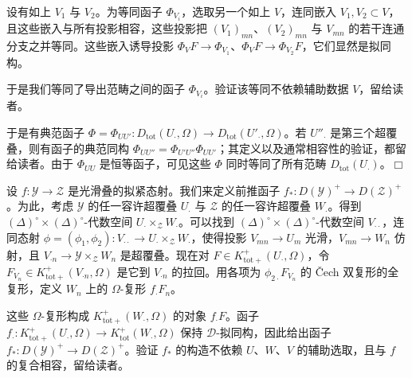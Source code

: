 设有如上 $V_{1}$ 与 $V_{2}$。为等同函子 $\Phi_{V_{i}}$，选取另一个如上 $V$，连同嵌入 $V_{1},V_{2}\subset V$，且这些嵌入与所有投影相容，这些投影把 $(V_{1})_{mn}$、$(V_{2})_{mn}$ 与 $V_{mn}$ 的若干连通分支之并等同。这些嵌入诱导投影 $\Phi_{V}F\to\Phi_{V_{1}}$、$\Phi_{V}F\to\Phi_{V_{2}}F$，它们显然是拟同构。


于是我们等同了导出范畴之间的函子 $\Phi_{V_{i}}$。验证该等同不依赖辅助数据 $V$，留给读者。

于是有典范函子 $\Phi=\Phi_{UU'}:D_{\mathrm{tot}}(U_{\cdot},\Omega)\to D_{\mathrm{tot}}(U'_{\cdot},\Omega)$。若 $U''_{\cdot}$ 是第三个超覆叠，则有函子的典范同构 $\Phi_{UU''}=\Phi_{U'U''}\Phi_{UU'}$；其定义以及通常相容性的验证，都留给读者。由于 $\Phi_{UU}$ 是恒等函子，可见这些 $\Phi$ 同时等同了所有范畴 $D_{\mathrm{tot}}(U_{\cdot})$。\hfill$\Box$

 设 $f:\mathcal{Y}\to\mathcal{Z}$ 是光滑叠的拟紧态射。我们来定义前推函子 $f_{*}:D(\mathcal{Y})^{+}\to D(\mathcal{Z})^{+}$。为此，考虑 $\mathcal{Y}$ 的任一容许超覆叠 $U_{\cdot}$ 与 $\mathcal{Z}$ 的任一容许超覆叠 $W_{\cdot}$。得到 $(\Delta)^{\circ}\times(\Delta)^{\circ}$-代数空间 $U_{\cdot}\times_{\mathcal{Z}}W_{\cdot}$。可以找到 $(\Delta)^{\circ}\times(\Delta)^{\circ}$-代数空间 $V_{\cdot\cdot}$，连同态射 $\phi=(\phi_{1},\phi_{2}):V_{\cdot\cdot}\to U_{\cdot}\times_{\mathcal{Z}}W_{\cdot}$，使得投影 $V_{mn}\to U_{m}$ 光滑，$V_{mn}\to W_{n}$ 仿射，且 $V_{\cdot n}\to\mathcal{Y}\times_{\mathcal{Z}}W_{n}$ 是超覆叠。现在对 $F\in K^{+}_{\mathrm{tot}+}(U_{\cdot},\Omega)$，令 $F_{V_{n}}\in K^{+}_{\mathrm{tot}+}(V_{\cdot n},\Omega)$ 是它到 $V_{\cdot n}$ 的拉回。用各项为 $\phi_{2\cdot}F_{V_{n}}$ 的 Čech 双复形的全复形，定义 $W_{n}$ 上的 $\Omega$-复形 $f_{\cdot}F_{n}$。


这些 $\Omega$-复形构成 $K^{+}_{\mathrm{tot}+}(W_{\cdot},\Omega)$ 的对象 $f_{\cdot}F$。函子 $f_{\cdot}:K^{+}_{\mathrm{tot}+}(U_{\cdot},\Omega)\to K^{+}_{\mathrm{tot}}(W_{\cdot},\Omega)$ 保持 $\mathcal{D}$-拟同构，因此给出函子 $f_{*}:D(\mathcal{Y})^{+}\to D(\mathcal{Z})^{+}$。验证 $f_{*}$ 的构造不依赖 $U$、$W$、$V$ 的辅助选取，且与 $f$ 的复合相容，留给读者。


